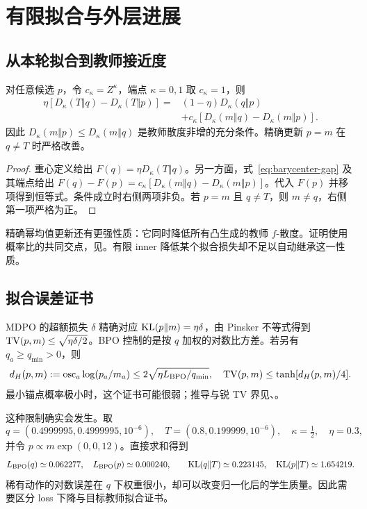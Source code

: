 \chapter{有限拟合与外层进展}
\label{ch:finite}
\section{从本轮拟合到教师接近度}
\begin{theorem}[重心进展恒等式]
\label{thm:progress}
对任意候选 $p$，令 $c_\kappa=Z^\kappa$，端点 $\kappa=0,1$ 取 $c_\kappa=1$，则
\begin{align}
\eta[D_\kappa(T\Vert q)-D_\kappa(T\Vert p)]
={}&(1-\eta)D_\kappa(q\Vert p)\nonumber\\
&+c_\kappa[D_\kappa(m\Vert q)-D_\kappa(m\Vert p)].
\label{eq:progress}
\end{align}
因此 $D_\kappa(m\Vert p)\le D_\kappa(m\Vert q)$ 是教师散度非增的充分条件。精确更新 $p=m$ 在 $q\ne T$ 时严格改善。
\end{theorem}
\begin{proof}
重心定义给出 $F(q)=\eta D_\kappa(T\Vert q)$。另一方面，式~\eqref{eq:barycenter-gap} 及其端点给出 $F(q)-F(p)=c_\kappa[D_\kappa(m\Vert q)-D_\kappa(m\Vert p)]$。代入 $F(p)$ 并移项得到恒等式。条件成立时右侧两项非负。若 $p=m$ 且 $q\ne T$，则 $m\ne q$，右侧第一项严格为正。
\end{proof}

精确幂均值更新还有更强性质：它同时降低所有凸生成的教师 $f$-散度。证明使用概率比的共同交点，见。有限 inner 降低某个拟合损失却不足以自动继承这一性质。

\section{拟合误差证书}
MDPO 的超额损失 $\delta$ 精确对应 $\operatorname{KL}(p\Vert m)=\eta\delta$，由 Pinsker 不等式得到 $\operatorname{TV}(p,m)\le\sqrt{\eta\delta/2}$。BPO 控制的是按 $q$ 加权的对数比方差。若另有 $q_a\ge q_{\min}>0$，则
\begin{equation}
d_H(p,m):=\operatorname{osc}_a\log(p_a/m_a)
\le2\sqrt{\eta L_{\rm BPO}/q_{\min}},
\quad
\operatorname{TV}(p,m)\le\tanh[d_H(p,m)/4].
\label{eq:bpo-certificate-main}
\end{equation}
最小锚点概率极小时，这个证书可能很弱；推导与锐 TV 界见、。

这种限制确实会发生。取
\begin{equation}
q=(0.4999995,0.4999995,10^{-6}),\quad
T=(0.8,0.199999,10^{-6}),\quad
\kappa=\tfrac12,\quad\eta=0.3,
\end{equation}
并令 $p\propto m\exp(0,0,12)$。直接求和得到
\begin{equation}
L_{\rm BPO}(q)\simeq0.062277,\quad L_{\rm BPO}(p)\simeq0.000240,
\qquad
\operatorname{KL}(q\Vert T)\simeq0.223145,\quad\operatorname{KL}(p\Vert T)\simeq1.654219.
\end{equation}
稀有动作的对数误差在 $q$ 下权重很小，却可以改变归一化后的学生质量。因此需要区分 loss 下降与目标教师拟合证书。

